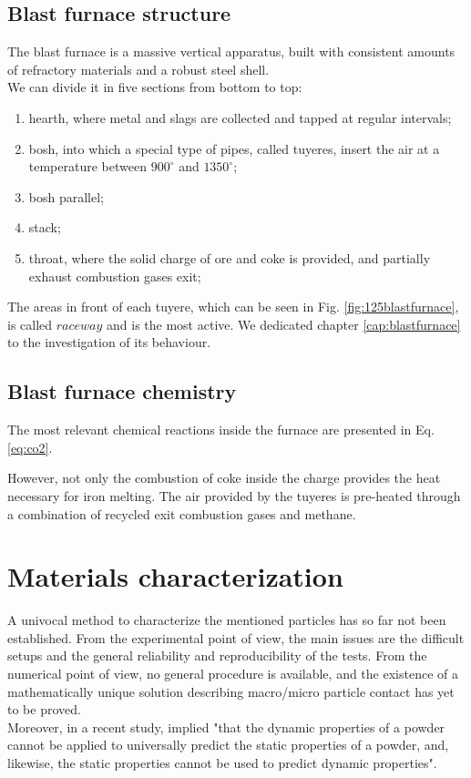 \subsection{Blast furnace structure}
\label{subsec:blastfurnacestructure}

The blast furnace is a massive vertical apparatus, built with consistent amounts
of refractory materials and a robust steel shell.\\
We can divide it in five sections from bottom to top:
\begin{enumerate}
  \item{hearth, where metal and slags are collected and tapped at regular
  intervals;}
  \item{bosh, into which a special type of pipes, called tuyeres, insert the air
  at a temperature between $900^{\circ}$ and $1350^{\circ}$;}
  \item{bosh parallel;}
  \item{stack;}
  \item{throat, where the solid charge of ore and coke is provided, and
  partially exhaust combustion gases exit;}
\end{enumerate}
The areas in front of each tuyere, which can be seen in Fig.
\ref{fig:125blastfurnace}, is called $raceway$ and is the most active. 
We dedicated chapter \ref{cap:blastfurnace} to the investigation of its
behaviour.

\subsection{Blast furnace chemistry}
\label{subsec:blastfurnacechemistry}

The most relevant chemical reactions inside the furnace are presented in Eq.
\ref{eq:co2}.



However, not only the combustion of coke inside the charge provides the heat
necessary for iron melting.
The air provided by the tuyeres is pre-heated through a combination of
recycled exit combustion gases and methane. 

\section{Materials characterization}
\label{sec:materialscharacterization}

A univocal
method to characterize the mentioned particles has so far not been established.
From the experimental point of view, the main issues are the difficult setups and the general 
reliability and reproducibility of the tests. 
From the numerical point of view, no general procedure is available, and the existence of a 
mathematically unique solution describing macro/micro particle contact has yet
to be proved.\\
Moreover, in a recent study, \citet{RefWorks:56} implied "that the dynamic properties of a 
powder cannot be applied to universally predict the static properties of a powder, and, likewise, 
the static properties cannot be used to predict dynamic properties".\\

